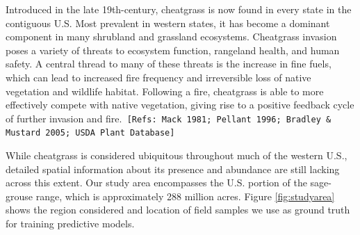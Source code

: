 \documentclass{article} %
\begin{document}
Introduced in the late 19th-century, cheatgrass is now found in every state in the contiguous U.S. Most prevalent in western states, it has become a dominant component in many shrubland and grassland ecosystems. 
Cheatgrass invasion poses a variety of threats to ecosystem function, rangeland health, and human safety. A central thread to many of these threats is the increase in fine fuels, which can lead to increased fire frequency and irreversible loss of native vegetation and wildlife habitat. Following a fire, cheatgrass is able to more effectively compete with native vegetation, giving rise to a positive feedback cycle of further invasion and fire.\texttt{ [Refs: Mack 1981; Pellant 1996; Bradley \& Mustard 2005; USDA Plant Database]}

While cheatgrass is considered ubiquitous throughout much of the western U.S., detailed spatial information about its presence and abundance are still lacking across this extent. Our study area encompasses the U.S. portion of the sage-grouse range, which is approximately 288 million acres.
Figure \ref{fig:studyarea} shows the region considered and location of field samples we use as ground truth for training predictive models.
\end{document}
